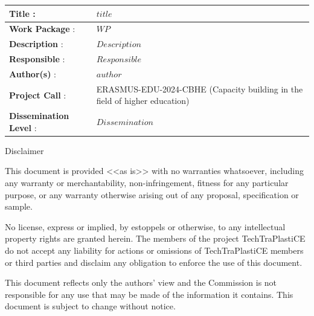 \vfill

\begin{tabular}{ >{\raggedright\arraybackslash}p{3.5cm}| p{12.5cm} }
  \toprule
  \textbf{Title} : & $title$  \\ \cmidrule{2-2}  
  \textbf{Work Package} : & $WP$  \\ \cmidrule{2-2}
  \textbf{Description} : & $Description$  \\ \cmidrule{2-2}
  \textbf{Responsible} : & $Responsible$  \\ \cmidrule{2-2}
  \textbf{Author(s)} : &  $author$ \\ \cmidrule{2-2}
  \textbf{Project Call} : & ERASMUS-EDU-2024-CBHE (Capacity building in the field of higher education)  \\ \cmidrule{2-2}
  \textbf{Dissemination Level} : & $Dissemination$\\ 
\bottomrule
\end{tabular}

\vfill




  
  
  \vfill
  
  {\scriptsize\centering\color{lightgray} 
  
  Disclaimer
  
  This document is provided <<as is>> with no warranties whatsoever, 
  including any warranty or merchantability, non-infringement, fitness for any particular 
  purpose, or any warranty otherwise arising out of any proposal, specification or sample.  
  
  No license, express or implied, by estoppels or otherwise, to any intellectual 
  property rights are granted herein. 
  The members of the project TechTraPlastiCE do not accept any liability for actions or 
  omissions of TechTraPlastiCE members or third parties and disclaim any obligation 
  to enforce the use of this document. 
  
  This document reflects only the authors' view and the Commission is not responsible 
  for any use that may be made of the information it contains.  
  This document is subject to change without notice. 
  
  }
  \normalsize
  
  
  
  